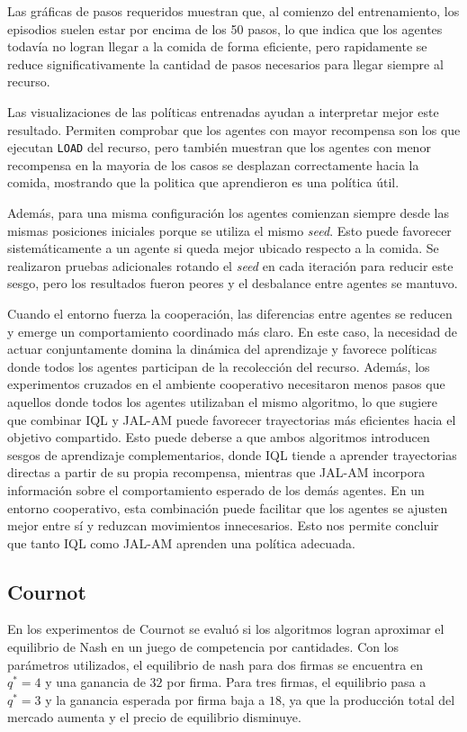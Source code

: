 \documentclass[letterpaper,12pt]{article} %
\begin{document}
Las gráficas de pasos requeridos muestran que, al comienzo del entrenamiento, los episodios suelen estar por encima de los 50 pasos, lo que indica que los agentes todavía no logran llegar a la comida de forma eficiente, pero rapidamente se reduce significativamente la cantidad de pasos necesarios para llegar siempre al recurso.

Las visualizaciones de las políticas entrenadas ayudan a interpretar mejor este resultado. 
Permiten comprobar que los agentes con mayor recompensa son los que ejecutan \texttt{LOAD} del recurso, 
pero también muestran que los agentes con menor recompensa en la mayoria de los casos se desplazan correctamente hacia la comida, mostrando que la politica que aprendieron es una política útil.

Además, para una misma configuración los agentes comienzan siempre desde las mismas posiciones iniciales porque se utiliza el mismo \textit{seed}. Esto puede favorecer sistemáticamente a un agente si queda mejor ubicado respecto a la comida. Se realizaron pruebas adicionales rotando el \textit{seed} en cada iteración para reducir este sesgo, pero los resultados fueron peores y el desbalance entre agentes se mantuvo.

Cuando el entorno fuerza la cooperación, las diferencias entre agentes se reducen y emerge un comportamiento coordinado más claro. 
En este caso, la necesidad de actuar conjuntamente domina la dinámica del aprendizaje y favorece políticas donde todos los agentes participan de la recolección del recurso. 
Además, los experimentos cruzados en el ambiente cooperativo necesitaron menos pasos que aquellos donde todos los agentes utilizaban el mismo algoritmo, lo que sugiere que combinar IQL y JAL-AM puede favorecer trayectorias más eficientes hacia el objetivo compartido. Esto puede deberse a que ambos algoritmos introducen sesgos de aprendizaje complementarios, donde IQL tiende a aprender trayectorias directas a partir de su propia recompensa, mientras que JAL-AM incorpora información sobre el comportamiento esperado de los demás agentes. En un entorno cooperativo, esta combinación puede facilitar que los agentes se ajusten mejor entre sí y reduzcan movimientos innecesarios.
Esto nos permite concluir que tanto IQL como JAL-AM aprenden una política adecuada.

\subsection{Cournot}

En los experimentos de Cournot se evaluó si los algoritmos logran aproximar el equilibrio de Nash en un juego de competencia por cantidades. Con los parámetros utilizados, el equilibrio de nash para dos firmas se encuentra en $q^*=4$ y una ganancia de $32$ por firma. Para tres firmas, el equilibrio pasa a $q^*=3$ y la ganancia esperada por firma baja a $18$, ya que la producción total del mercado aumenta y el precio de equilibrio disminuye.
\end{document}
